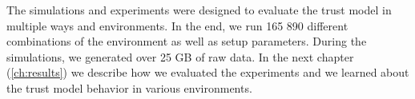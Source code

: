 \vspace{1cm}

\noindent
The simulations and experiments were designed to evaluate the trust model in multiple ways and environments.
In the end, we run 165 890 different combinations of the environment as well as setup parameters.
During the simulations, we generated over 25 GB of raw data.
In the next chapter (\ref{ch:results}) we describe how we evaluated the experiments and we learned about the trust model behavior in various environments.